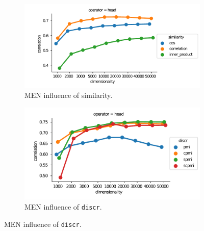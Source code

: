 \begin{figure}[b]
  \centering
  \begin{subfigure}[t]{0.49\textwidth}
    \hspace{-20pt}
    \includegraphics[width=1.1\textwidth]{supplement/figures/men-interaction-similarity}

  \caption{MEN influence of similarity.}
  \label{fig:men-similarity}
  \end{subfigure}
  \begin{subfigure}[t]{0.49\textwidth}
    \includegraphics[width=\textwidth]{supplement/figures/men-interaction-discr}

  \caption{MEN influence of \texttt{discr}.}
  \label{fig:men-discr}
  \end{subfigure}
\end{figure}
